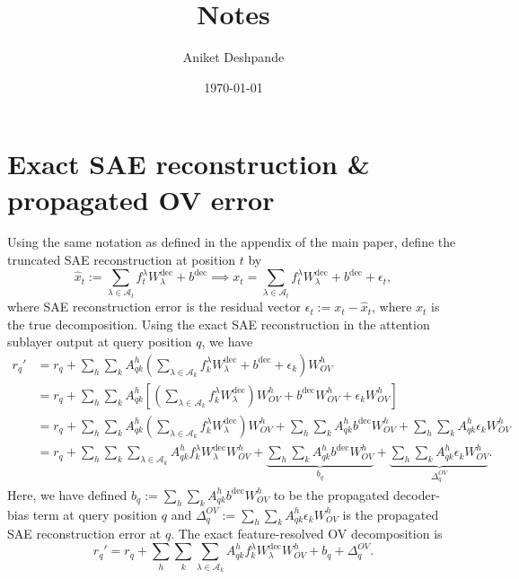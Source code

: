 \documentclass[10pt]{article}
\title{\vspace{-2em} Notes}
\author{Aniket Deshpande}
\date{\today}
\theoremstyle{definition}
\newcommand{\R}{\mathbb{R}}
\newcommand{\1}{\mathbf{1}}
\newcommand{\dec}{\mathrm{dec}}
\begin{document}
\maketitle
\vspace{-2em}



\section{Exact SAE reconstruction \& propagated OV error}

Using the same notation as defined in the appendix of the main paper, define the truncated SAE reconstruction at position $t$ by
\begin{equation}
    \hat{x}_t := \sum_{\lambda \in \mathcal A_t}f_t^\lambda W_\lambda^\dec + b^\dec \implies x_t = \sum_{\lambda \in \mathcal A_t}f_t^\lambda W_\lambda^\dec + b^\dec + \epsilon_t,
\end{equation}
where SAE reconstruction error is the residual vector $\epsilon_t := x_t - \hat{x}_t$, where $x_t$ is the true decomposition. Using the exact SAE reconstruction in the attention sublayer output at query position $q$, we have
\begin{align}
    r_q' &= r_q + \sum_h\sum_k A_{qk}^h \left(\sum_{\lambda \in \mathcal A_k}f_k^\lambda W_\lambda^\dec + b^\dec + \epsilon_k\right) W_{OV}^h \\
    &= r_q + \sum_h\sum_k A_{qk}^h \left[ \left(\sum_{\lambda \in \mathcal A_k}f_k^\lambda W_\lambda^\dec\right)W_{OV}^h + b^\dec W_{OV}^h + \epsilon_k W_{OV}^h \right] \\
    &= r_q + \sum_h\sum_k A_{qk}^h \left(\sum_{\lambda \in \mathcal A_k}f_k^\lambda W_\lambda^\dec\right)W_{OV}^h + \sum_h\sum_k A_{qk}^h b^\dec W_{OV}^h + \sum_h\sum_k A_{qk}^h \epsilon_k W_{OV}^h  \\
    &= r_q + \sum_h\sum_k \sum_{\lambda \in \mathcal A_k}A_{qk}^h f_k^\lambda W_\lambda^\dec W_{OV}^h + \underbrace{ \sum_h\sum_k A_{qk}^h b^\dec W_{OV}^h}_{b_q} + \underbrace{\sum_h\sum_k A_{qk}^h \epsilon_k W_{OV}^h}_{\Delta_q^{OV}}.
\end{align}
Here, we have defined $b_q :=\sum_h\sum_k A_{qk}^h b^\dec W_{OV}^h$ to be the propagated decoder-bias term at query position $q$ and $\Delta_q^{OV} := \sum_h\sum_k A_{qk}^h \epsilon_k W_{OV}^h$ is the propagated SAE reconstruction error at $q$. The exact feature-resolved OV decomposition is
\begin{equation}
    \boxed{r_q' = r_q + \sum_h\sum_k \sum_{\lambda \in \mathcal A_k}A_{qk}^h f_k^\lambda W_\lambda^\dec W_{OV}^h + b_q + \Delta_q^{OV}.}
\end{equation}
\end{document}
